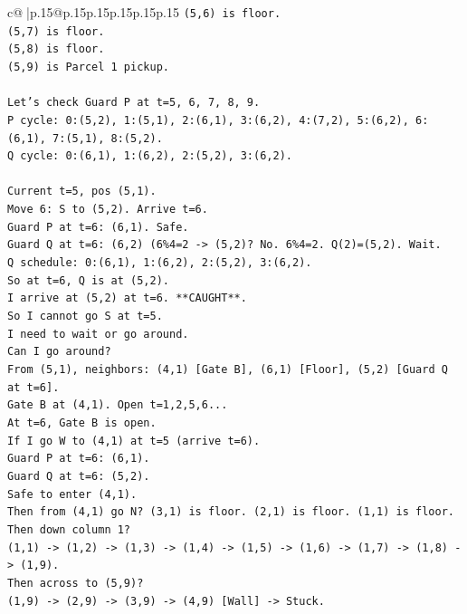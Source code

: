 \documentclass{article}
\begin{document}
{\begin{supertabular}{c@{$\;$}|p{.15\linewidth}@{}p{.15\linewidth}p{.15\linewidth}p{.15\linewidth}p{.15\linewidth}p{.15\linewidth}}
{{{\texttt{(5,6) is floor.} \\
\texttt{(5,7) is floor.} \\
\texttt{(5,8) is floor.} \\
\texttt{(5,9) is Parcel 1 pickup.} \\
\\ 
\texttt{Let's check Guard P at t=5, 6, 7, 8, 9.} \\
\texttt{P cycle: 0:(5,2), 1:(5,1), 2:(6,1), 3:(6,2), 4:(7,2), 5:(6,2), 6:(6,1), 7:(5,1), 8:(5,2).} \\
\texttt{Q cycle: 0:(6,1), 1:(6,2), 2:(5,2), 3:(6,2).} \\
\\ 
\texttt{Current t=5, pos (5,1).} \\
\texttt{Move 6: S to (5,2). Arrive t=6.} \\
\texttt{Guard P at t=6: (6,1). Safe.} \\
\texttt{Guard Q at t=6: (6,2) (6\%4=2 {-}> (5,2)? No. 6\%4=2. Q(2)=(5,2). Wait.} \\
\texttt{Q schedule: 0:(6,1), 1:(6,2), 2:(5,2), 3:(6,2).} \\
\texttt{So at t=6, Q is at (5,2).} \\
\texttt{I arrive at (5,2) at t=6. **CAUGHT**.} \\
\texttt{So I cannot go S at t=5.} \\
\texttt{I need to wait or go around.} \\
\texttt{Can I go around?} \\
\texttt{From (5,1), neighbors: (4,1) {[}Gate B{]}, (6,1) {[}Floor{]}, (5,2) {[}Guard Q at t=6{]}.} \\
\texttt{Gate B at (4,1). Open t=1,2,5,6...} \\
\texttt{At t=6, Gate B is open.} \\
\texttt{If I go W to (4,1) at t=5 (arrive t=6).} \\
\texttt{Guard P at t=6: (6,1).} \\
\texttt{Guard Q at t=6: (5,2).} \\
\texttt{Safe to enter (4,1).} \\
\texttt{Then from (4,1) go N? (3,1) is floor. (2,1) is floor. (1,1) is floor.} \\
\texttt{Then down column 1?} \\
\texttt{(1,1) {-}> (1,2) {-}> (1,3) {-}> (1,4) {-}> (1,5) {-}> (1,6) {-}> (1,7) {-}> (1,8) {-}> (1,9).} \\
\texttt{Then across to (5,9)?} \\
\texttt{(1,9) {-}> (2,9) {-}> (3,9) {-}> (4,9) {[}Wall{]} {-}> Stuck.} \\
}}}
\end{supertabular}}
\end{document}
